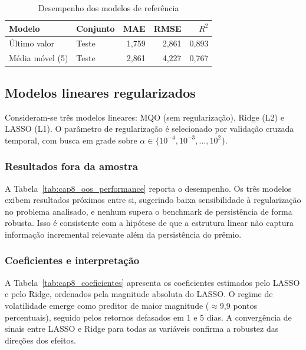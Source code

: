 \begin{table}[H]
\centering
\caption{Desempenho dos modelos de referência}
\label{tab:cap5_benchmarks}
\footnotesize
\begin{tabular}{llrrr}
\toprule
Modelo & Conjunto & MAE & RMSE & $R^2$ \\
\midrule
Último valor    & Teste & 1,759 & 2,861 & 0,893 \\
Média móvel (5) & Teste & 2,861 & 4,227 & 0,767 \\
\bottomrule
\end{tabular}
\end{table}

\subsection{Modelos lineares regularizados}
\label{sec:cap5_lineares}
\label{sec:cap6_lineares}

Consideram-se três modelos lineares: MQO (sem regularização), Ridge (L2) e
LASSO (L1). O parâmetro de regularização é selecionado por validação cruzada
temporal, com busca em grade sobre $\alpha \in \{10^{-4}, 10^{-3}, \ldots, 10^{2}\}$.

\subsubsection{Resultados fora da amostra}
\label{subsec:cap5_lineares_resultados}

A Tabela~\ref{tab:cap8_oos_performance} reporta o desempenho. Os três modelos exibem
resultados próximos entre si, sugerindo baixa sensibilidade à regularização no
problema analisado, e nenhum supera o benchmark de persistência de forma robusta.
Isso é consistente com a hipótese de que a estrutura linear não captura informação
incremental relevante além da persistência do prêmio.

\subsubsection{Coeficientes e interpretação}
\label{subsec:cap5_lineares_coeficientes}

A Tabela~\ref{tab:cap8_coeficientes} apresenta os coeficientes estimados pelo
LASSO e pelo Ridge, ordenados pela magnitude absoluta do LASSO. O regime de
volatilidade emerge como preditor de maior magnitude ($\approx$9,9 pontos percentuais),
seguido pelos retornos defasados em 1 e 5 dias. A convergência de sinais entre LASSO
e Ridge para todas as variáveis confirma a robustez das direções dos efeitos.

